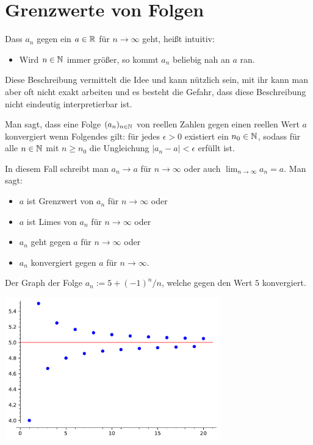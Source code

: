 \section{Grenzwerte von Folgen} 

\begin{bem} 
	Dass $a_n$ gegen ein $a \in \mathbb{R}$ für $n \to \infty$ geht, heißt intuitiv: 
	
	\begin{itemize}
			\item[] Wird  $n \in \mathbb{N}$ immer größer, so kommt $a_n$ beliebig nah an $a$ ran. 
	\end{itemize} 

	Diese Beschreibung vermittelt die Idee und kann nützlich sein, mit ihr kann man aber oft nicht exakt arbeiten und es besteht die Gefahr, dass diese Beschreibung nicht eindeutig  interpretierbar ist. 
\end{bem} 

\begin{defn} 
	Man sagt, dass eine Folge $(a_n)_{n \in \mathbb{N}}$ von reellen Zahlen gegen einen reellen Wert $a$ konvergiert wenn Folgendes gilt: für jedes $\epsilon>0$ existiert ein $n_0 \in \mathbb{N}$, sodass für alle $n \in \mathbb{N}$ mit $n \ge n_0$ die Ungleichung $|a_n - a| < \epsilon$ erfüllt ist. 
	
	In diesem Fall schreibt man $a_n \to a$ für $n \to \infty$ oder auch $\lim_{n \to \infty} a_n = a$. Man sagt: 
	\begin{itemize}
		\item $a$ ist Grenzwert von $a_n$ für $n  \to \infty$ oder 
		\item $a$ ist Limes von $a_n$ für $n \to \infty$ oder 
		\item $a_n$ geht gegen $a$ für $n \to \infty$ oder 
		\item $a_n$ konvergiert gegen $a$ für $n \to \infty$. 
	\end{itemize} 
\end{defn} 

\begin{bem}
	Der Graph der Folge $a_n := 5 + (-1)^n / n$, welche gegen den Wert $5$ konvergiert. 
\begin{center}
	\includegraphics[width=0.7\textwidth]{code/grenzwert.pdf}
\end{center} 
\end{bem} 

